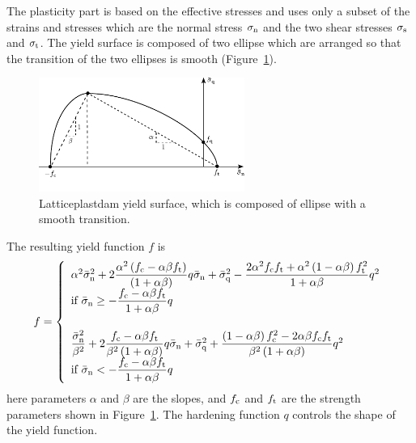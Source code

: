 \documentclass[a4paper]{article}
\begin{document}
The plasticity part is based on the effective stresses and uses only a subset of the strains and stresses which are the normal stress $\sigma_{\rm n}$ and the two shear stresses $\sigma_{\rm s}$ and $\sigma_{\rm t}$. The yield surface is composed of two ellipse which are arranged so that the transition of the two ellipses is smooth (Figure~\ref{plastdamyieldfig}).
%
\begin{figure}[htb]
  \centering
  \includegraphics[width=0.6\textwidth]{./plastdamyieldfig.pdf}
 \caption{Latticeplastdam yield surface, which is composed of ellipse with a smooth transition.}
 \label{plastdamyieldfig}
\end{figure}
%
The resulting yield function $f$ is
\begin{equation}
f = \left\{ \begin{array}{l} \alpha^2\bar{\sigma}_{\rm n}^2 + 2 \dfrac{\alpha^2\left(f_{\rm c} - \alpha \beta f_{\rm t}\right)}{\left(1+\alpha \beta\right)} q \bar{\sigma}_{\rm n} + \bar{\sigma}_{\rm q}^2 - \dfrac{2 \alpha^2 f_{\rm c}f_{\rm t} + \alpha^2 \left(1-\alpha \beta \right) f_{\rm t}^2}{1+\alpha \beta} q^2 \\ \mbox{if $\bar{\sigma}_{\rm n} \geq -\dfrac{f_{\rm c} - \alpha \beta f_{\rm t}}{1+\alpha \beta} q$} \vspace{0.5cm}\\
  \dfrac{\bar{\sigma}_{\rm n}^2}{\beta^2} + 2 \dfrac{f_{\rm c} - \alpha \beta f_{\rm t}}{\beta^2 \left(1+\alpha \beta \right)} q \bar{\sigma}_{\rm n} + \bar{\sigma}_{\rm q}^2 + \dfrac{\left(1-\alpha \beta\right) f_{\rm c}^2 -2 \alpha \beta f_{\rm c} f_{\rm t} }{\beta^2 \left(1+\alpha \beta \right)} q^2\\ \mbox{if $\bar{\sigma}_{\rm n} < - \dfrac{f_{\rm c} - \alpha \beta f_{\rm t}}{1+\alpha \beta} q$} \end{array} \right.
  \end{equation}
here parameters $\alpha$ and $\beta$ are the slopes, and $f_{\rm c}$ and $f_{\rm t}$ are the strength parameters shown in Figure~\ref{plastdamyieldfig}. The hardening function $q$ controls the shape of the yield function.
\end{document}
